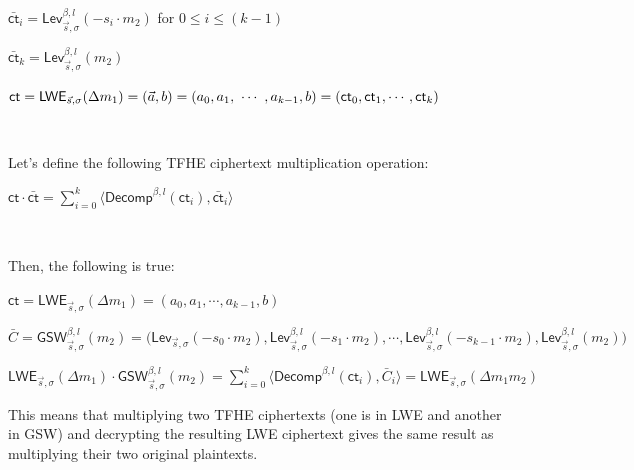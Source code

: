 $\bar{\textsf{ct}}_i = \textsf{Lev}_{\vec{s}, \sigma}^{\beta, l}(-s_i \cdot m_2)$ for $0 \leq i \leq (k-1)$

$\bar{\textsf{ct}}_k = \textsf{Lev}_{\vec{s}, \sigma}^{\beta, l}(m_2)$

$\textsf{ct} = \textsf{LWE}_{\vec{s}, \sigma}(\Delta m_1) = (\vec{a}, b) = (a_0, a_1, \text{ } \text{$\cdots$} \text{ }, a_{k-1}, b) = (\textsf{ct}_0, \textsf{ct}_1, \cdots, \textsf{ct}_k)$

$ $

\noindent Let's define the following TFHE ciphertext multiplication operation: 

$\textsf{ct} \cdot {\bar{\textsf{ct}}} = \sum\limits_{i=0}^{k}\langle \textsf{Decomp}^{\beta, l}(\textsf{ct}_i), \bar{\textsf{ct}}_i \rangle$

$ $

\noindent Then, the following is true:

\begin{tcolorbox}[title={\textbf{\tboxlabel{\ref*{subsec:tfhe-mult-cipher}} TFHE Ciphertext-to-Ciphertext Multiplication}}]
$\textsf{ct} = \textsf{LWE}_{\vec{s}, \sigma}(\Delta m_1) = (a_0, a_1, \cdots, a_{k-1}, b)$

$\bar{C} = \textsf{GSW}_{\vec{s}, \sigma}^{\beta, l}(m_2) = \bm( \textsf{Lev}_{\vec{s}, \sigma}(-s_0\cdot m_2), \textsf{Lev}_{\vec{s}, \sigma}^{\beta, l}(-s_1\cdot m_2), \cdots, \textsf{Lev}_{\vec{s}, \sigma}^{\beta, l}(-s_{k-1}\cdot m_2), \textsf{Lev}_{\vec{s}, \sigma}^{\beta, l}(m_2)  \bm)$

$\textsf{LWE}_{\vec{s}, \sigma}(\Delta m_1) \cdot \textsf{GSW}_{\vec{s}, \sigma}^{\beta, l}(m_2) = \sum\limits_{i=0}^{k}\langle \textsf{Decomp}^{\beta, l}(\textsf{ct}_i), \bar{C}_i \rangle = \textsf{LWE}_{\vec{s}, \sigma}(\Delta m_1 m_2)$
\end{tcolorbox}

This means that multiplying two TFHE ciphertexts (one is in LWE and another in GSW) and decrypting the resulting LWE ciphertext gives the same result as multiplying their two original plaintexts. 

$ $

